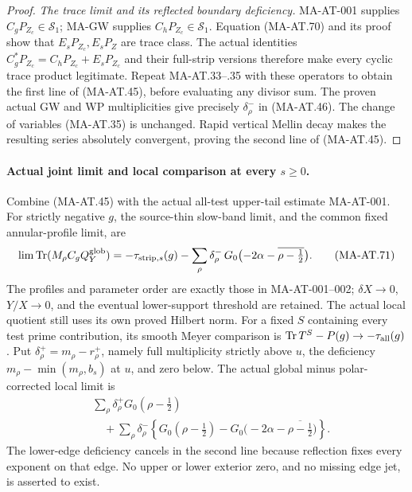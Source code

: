 \begin{proof}
\emph{The trace limit and its reflected boundary deficiency.}
MA-AT-001 supplies \(C_gP_{Z_c}\in\mathcal S_1\);
MA-GW supplies \(C_hP_{Z_c}\in\mathcal S_1\).
Equation (MA-AT.70) and its proof show that
\(E_sP_{Z_c},E_sP_Z\) are trace class.
The actual identities \(C_g^*P_{Z_c}=C_hP_{Z_c}+E_sP_{Z_c}\)
and their full-strip versions therefore make every cyclic
trace product legitimate.
Repeat MA-AT.33--.35 with these operators to obtain the
first line of (MA-AT.45), before evaluating any divisor sum.
The proven actual GW and WP multiplicities give precisely
\(\delta_\rho^-\) in (MA-AT.46).
The change of variables (MA-AT.35) is unchanged.
Rapid vertical Mellin decay makes the resulting series
absolutely convergent, proving the second line of (MA-AT.45).
\end{proof}

\paragraph{Actual joint limit and local comparison at every \(s\ge0\).}
Combine (MA-AT.45) with the actual all-test upper-tail estimate
MA-AT-001.  For strictly negative \(g\), the source-thin
slow-band limit, and the common fixed annular-profile limit, are
\[
 \lim\operatorname{Tr}(M_\rho C_gQ_Y^{\rm glob})
    =-\tau_{{\rm strip},s}(g)
       -\sum_\rho\delta_\rho^-\,
            G_0\bigl(-2\alpha-\overline{\rho-\tfrac12}\bigr).
 \tag{MA-AT.71}
\]
The profiles and parameter order are exactly those in
MA-AT-001--002; \(\delta X\to0\), \(Y/X\to0\), and the
eventual lower-support threshold are retained.
The actual local quotient still uses its own proved Hilbert
norm.  For a fixed \(S\) containing every test prime contribution,
its smooth Meyer comparison is
\(\operatorname{Tr}T^S-P(g)\to-\tau_{\rm all}(g)\).
Put \(\delta_\rho^+=m_\rho-r_\rho^+\), namely full multiplicity
strictly above \(u\), the deficiency
\(m_\rho-\min(m_\rho,b_s)\) at \(u\), and zero below.
The actual global minus polar-corrected local limit is
\[
 \begin{split}
 &\sum_\rho\delta_\rho^+G_0(\rho-\tfrac12)\\
 &\quad+\sum_\rho\delta_\rho^-
       \left\{G_0(\rho-\tfrac12)
         -G_0\bigl(-2\alpha-\overline{\rho-\tfrac12}\bigr)\right\}.
 \end{split}
 \tag{MA-AT.72}
\]
The lower-edge deficiency cancels in the second line because
reflection fixes every exponent on that edge.
No upper or lower exterior zero, and no missing edge jet,
is asserted to exist.

